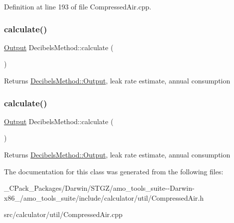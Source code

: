 Definition at line 193 of file Compressed\+Air.\+cpp.

\mbox{\label{class_decibels_method_a89591fa032865b58a6d63c05bc16eb8b}} 
\subsubsection{\texorpdfstring{calculate()}{calculate()}\hspace{0.1cm}{\footnotesize\ttfamily [2/3]}}
{\footnotesize\ttfamily \hyperlink{struct_decibels_method_1_1_output}{Output} Decibels\+Method\+::calculate (\begin{DoxyParamCaption}{ }\end{DoxyParamCaption})}

\begin{DoxyReturn}{Returns}
\hyperlink{struct_decibels_method_1_1_output}{Decibels\+Method\+::\+Output}, leak rate estimate, annual consumption 
\end{DoxyReturn}
\mbox{\label{class_decibels_method_a89591fa032865b58a6d63c05bc16eb8b}} 
\subsubsection{\texorpdfstring{calculate()}{calculate()}\hspace{0.1cm}{\footnotesize\ttfamily [3/3]}}
{\footnotesize\ttfamily \hyperlink{struct_decibels_method_1_1_output}{Output} Decibels\+Method\+::calculate (\begin{DoxyParamCaption}{ }\end{DoxyParamCaption})}

\begin{DoxyReturn}{Returns}
\hyperlink{struct_decibels_method_1_1_output}{Decibels\+Method\+::\+Output}, leak rate estimate, annual consumption 
\end{DoxyReturn}


The documentation for this class was generated from the following files\+:\begin{DoxyCompactItemize}
\item 
\+\_\+\+C\+Pack\+\_\+\+Packages/\+Darwin/\+S\+T\+G\+Z/amo\+\_\+tools\+\_\+suite-\/-\/\+Darwin-\/x86\+\_/amo\+\_\+tools\+\_\+suite/include/calculator/util/Compressed\+Air.\+h\item 
src/calculator/util/Compressed\+Air.\+cpp\end{DoxyCompactItemize}
